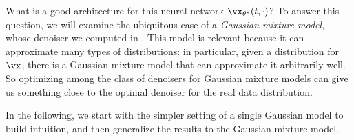 \documentclass[../../book-main.tex]{subfiles}
\begin{document}
What is a good architecture for this neural network \(\bar{\vx}_{\theta^{\ast}}(t, \cdot)\)? To answer this question, we will examine the ubiquitous case of a \textit{Gaussian mixture model},  whose denoiser we computed in . This model is relevant because it can approximate many types of distributions: in particular, given a distribution for \(\vx\), there is a Gaussian mixture model that can approximate it arbitrarily well. So optimizing among the class of denoisers for Gaussian mixture models can give us something close to the optimal denoiser for the real data distribution. {\color{blue} In the following, we start with the simpler setting of a single Gaussian model to build intuition, and then generalize the results to the Gaussian mixture model.

}
\end{document}
